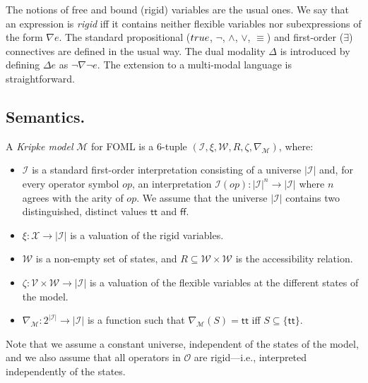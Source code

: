 \documentclass{easychair}
\newcommand{\fun}{\rightarrow}
\newcommand{\true}{\textsf{tt}}
\newcommand{\false}{\textsf{ff}}
\newcommand{\modal}{\nabla}
\newcommand{\dual}{\Delta}
\newcommand{\II}{\mathcal{I}}
\newcommand{\MM}{\mathcal{M}}
\newcommand{\OO}{\mathcal{O}}
\newcommand{\VV}{\mathcal{V}}
\newcommand{\WW}{\mathcal{W}}
\newcommand{\XX}{\mathcal{X}}
\newcommand{\edmargin}[2]{\marginpar{\raggedright\footnotesize\color{red}#1: #2}}
\newcommand{\edmargin}[2]{}
\def\smmargin{\edmargin{SM}}
\newcommand{\TRUE}{\mbox{\sc true}}
\begin{document}
The notions of free and bound (rigid) variables are the usual ones. We say that
an expression is \emph{rigid} iff it contains neither flexible variables
nor subexpressions of the form
$\modal e$. The
standard propositional ($\TRUE$, $\lnot$, $\land$, $\lor$, $\equiv$)
and first-order ($\exists$) connectives are defined in the usual
way. The dual modality $\dual$ is introduced by defining $\dual e$ as
$\lnot\modal\lnot e$.
The extension to a multi-modal language is straightforward.

\subsection{Semantics.}

A \emph{Kripke model} $\MM$ for FOML
is a 6-tuple $(\II, \xi, \WW, R, \zeta, \modal_{\MM})$,
where:
\begin{itemize}
\item $\II$ is a standard first-order interpretation consisting of a universe
  $|\II|$ and, for every operator symbol $op$, an interpretation
%
  \(
    \II(op): |\II|^n \rightarrow |\II|
  \)
%
  where $n$ agrees with the arity of $op$. We assume that the universe $|\II|$
  contains two distinguished, distinct values $\true$ and $\false$.
\item $\xi: \XX \rightarrow |\II|$ is a valuation of the rigid variables.
\item $\WW$ is a non-empty set of states, and
  $R \subseteq \WW \times \WW$ is the accessibility relation.
\item $\zeta: \VV \times \WW \rightarrow |\II|$ is a valuation of the flexible
  variables at the different states of the model.
\item $\modal_{\MM}: 2^{|\II|} \fun |\II|$ is a function such that
  $\modal_{\MM}(S) = \true$ iff $S \subseteq \{\true\}$.
\end{itemize}
%
Note that we assume a constant universe, independent of the states of
the model, and we also assume that all operators in $\OO$
are rigid---i.e., interpreted independently of
the states.
\end{document}
